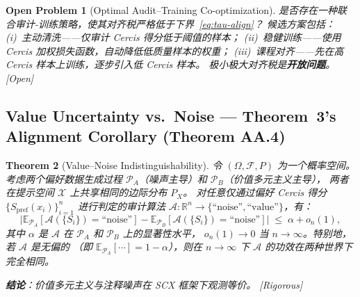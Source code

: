 \documentclass[12pt,a4paper]{article}
\newtheorem{theorem}{Theorem}[section]
\newtheorem{openproblem}[theorem]{Open Problem}
\newcommand{\rigorous}{\textcolor{green!50!black}{\small\textsf{[Rigorous]}}}
\newcommand{\openquest}{\textcolor{red!70!black}{\small\textsf{[Open]}}}
\newcommand{\R}{\mathbb{R}}
\newcommand{\E}{\mathbb{E}}
\newcommand{\cX}{\mathcal{X}}
\newcommand{\Alg}{\mathcal{A}}
\begin{document}
\begin{openproblem}[Optimal Audit--Training Co-optimization]
\label{prob:joint-opt}
是否存在一种联合审计-训练策略，使其对齐税严格低于下界~\eqref{eq:tau-align}？
候选方案包括：(i)~主动清洗——仅审计 Cercis 得分低于阈值的样本；
(ii)~稳健训练——使用 Cercis 加权损失函数，自动降低低质量样本的权重；
(iii)~课程对齐——先在高 Cercis 样本上训练，逐步引入低 Cercis 样本。
极小极大对齐税是\textbf{开放问题}。\openquest
\end{openproblem}

\subsection{Value Uncertainty vs.\ Noise --- Theorem~3's Alignment Corollary (Theorem AA.4)}

\begin{theorem}[Value--Noise Indistinguishability]
\label{thm:value-noise}
令 $(\Omega,\mathcal{F},P)$ 为一个概率空间。考虑两个偏好数据生成过程
$\mathcal{P}_A$（噪声主导）和 $\mathcal{P}_B$（价值多元主义主导），
两者在提示空间 $\cX$ 上共享相同的边际分布 $P_X$。
对任意仅通过偏好 Cercis 得分 $\{S_{\mathrm{pref}}(x_i)\}_{i=1}^n$ 进行判定的审计算法
$\Alg: \R^n \to \{\text{``noise''},\text{``value''}\}$，有：
\[
\bigl|\E_{\mathcal{P}_A}[\Alg(\{S_i\})=\text{``noise''}]
- \E_{\mathcal{P}_B}[\Alg(\{S_i\})=\text{``noise''}]\bigr|
\;\leq\; \alpha + o_n(1),
\]
其中 $\alpha$ 是 $\Alg$ 在 $\mathcal{P}_A$ 和 $\mathcal{P}_B$ 上的显著性水平，
$o_n(1)\to 0$ 当 $n\to\infty$。特别地，若 $\Alg$ 是无偏的
（即 $\E_{\mathcal{P}_A}[\cdots] = 1-\alpha$），则在 $n\to\infty$ 下
$\Alg$ 的功效在两种世界下完全相同。

\textbf{结论}：价值多元主义与注释噪声在 SCX 框架下观测等价。
\rigorous
\end{theorem}
\end{document}
